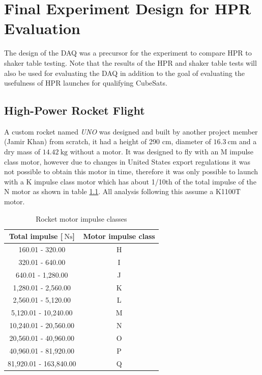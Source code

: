 \documentclass{report}
\begin{document}
\chapter{Final Experiment Design for HPR Evaluation}

The design of the DAQ was a precursor for the experiment to compare HPR to shaker table testing. Note that the results of the HPR and shaker table tests will also be used for evaluating the DAQ in addition to the goal of evaluating the usefulness of HPR launches for qualifying CubeSats.

\section{High-Power Rocket Flight}

A custom rocket named \textit{UNO} was designed and built by another project member (Jamir Khan) from scratch, it had a height of 290 cm, diameter of $\SI{16.3}{\centi\metre}$ and a dry mass of $\SI{14.42}{\kilo\gram}$ without a motor. It was designed to fly with an M impulse class motor, however due to changes in United States export regulations it was not possible to obtain this motor in time, therefore it was only possible to launch with a K impulse class motor which has about 1/10th of the total impulse of the N motor as shown in table \ref{tabl:impulseclasses}. All analysis following this assume a K1100T motor.

\begin{table}[H]
  \centering
  \begin{tabular}{|c|c|}
    \hline
    Total impulse [$\SI{}{\newton\second}$] & Motor impulse class \\\hline
    160.01 - 320.00                         & H                   \\
    320.01 - 640.00                         & I                   \\
    640.01 - 1,280.00                       & J                   \\
    1,280.01 - 2,560.00                     & K                   \\
    2,560.01 - 5,120.00                     & L                   \\
    5,120.01 - 10,240.00                    & M                   \\
    10,240.01 - 20,560.00                   & N                   \\
    20,560.01 - 40,960.00                   & O                   \\
    40,960.01 - 81,920.00                   & P                   \\
    81,920.01 - 163,840.00                  & Q                   \\
    \hline
  \end{tabular}
  \caption{Rocket motor impulse classes \cite{nfpa2018}}
  \label{tabl:impulseclasses}
\end{table}
\end{document}
